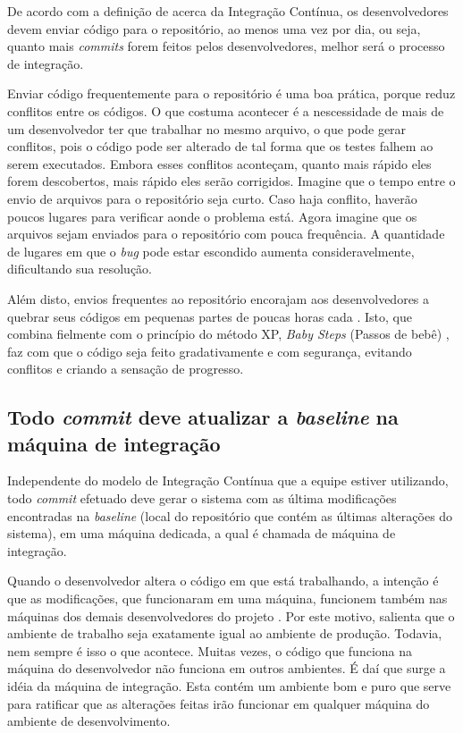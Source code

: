 De acordo com a definição de  acerca da Integração Contínua, os desenvolvedores devem enviar código para o repositório, ao menos uma vez por dia, ou seja, quanto mais \textit{commits} forem feitos pelos desenvolvedores, melhor será o processo de integração.

Enviar código frequentemente para o repositório é uma boa prática, porque reduz conflitos entre os códigos. O que costuma acontecer é a nescessidade de mais de um desenvolvedor ter que trabalhar no mesmo arquivo, o que pode gerar conflitos, pois o código pode ser alterado de tal forma que os testes falhem ao serem executados. Embora esses conflitos aconteçam, quanto mais rápido eles forem descobertos, mais rápido eles serão corrigidos. Imagine que o tempo entre o envio de arquivos para o repositório seja curto. Caso haja conflito, haverão poucos lugares para verificar aonde o problema está. Agora imagine que os arquivos sejam enviados para o repositório com pouca frequência. A quantidade de lugares em que o \textit{bug} pode estar escondido aumenta consideravelmente, dificultando sua resolução.

Além disto, envios frequentes ao repositório encorajam aos desenvolvedores a quebrar seus códigos em pequenas partes de poucas horas cada \cite{FOWLER}. Isto, que combina fielmente com o princípio do método XP, \textit{Baby Steps} (Passos de bebê) \cite{IMPROVEIT-PASSOS}, faz com que o código seja feito gradativamente e com segurança, evitando conflitos e criando a sensação de progresso.

\subsection{Todo \textit{commit} deve atualizar a \textit{baseline} na máquina de integração}

Independente do modelo de Integração Contínua que a equipe estiver utilizando, todo \textit{commit} efetuado deve gerar o sistema com as última modificações encontradas na \textit{baseline} (local do repositório que contém as últimas alterações do sistema), em uma máquina dedicada, a qual é chamada de máquina de integração.

Quando o desenvolvedor altera o código em que está trabalhando, a intenção é que as modificações, que funcionaram em uma máquina, funcionem também nas máquinas dos demais desenvolvedores do projeto \cite{SHORE}. Por este motivo,  salienta que o ambiente de trabalho seja exatamente igual ao ambiente de produção. Todavia, nem sempre é isso o que acontece. Muitas vezes, o código que funciona na máquina do desenvolvedor não funciona em outros ambientes. É daí que surge a idéia da máquina de integração. Esta contém um ambiente bom e puro que serve para ratificar que as alterações feitas irão funcionar em qualquer máquina do ambiente de desenvolvimento.

